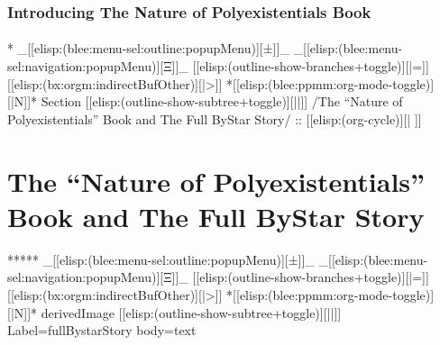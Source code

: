 \begin{whenOrg}
\begin{verblatex}
\begin{frame}[fragile,label=part_polyexistentialsBook]
    \frametitle{Introducing The Nature of Polyexistentials Book}
    \framesubtitle{}

    \tableofcontents

\end{frame}
\end{verblatex}



\begin{whenOrg}
*  _[[elisp:(blee:menu-sel:outline:popupMenu)][±]]_ _[[elisp:(blee:menu-sel:navigation:popupMenu)][Ξ]]_ [[elisp:(outline-show-branches+toggle)][|=]] [[elisp:(bx:orgm:indirectBufOther)][|>]] *[[elisp:(blee:ppmm:org-mode-toggle)][|N]]*  Section    [[elisp:(outline-show-subtree+toggle)][||]]   /The ``Nature of Polyexistentials'' Book and The Full ByStar Story/ ::  [[elisp:(org-cycle)][| ]]
\end{whenOrg}

\section{The ``Nature of Polyexistentials'' Book and The Full ByStar Story}



\begin{whenOrg}
*****  _[[elisp:(blee:menu-sel:outline:popupMenu)][±]]_ _[[elisp:(blee:menu-sel:navigation:popupMenu)][Ξ]]_ [[elisp:(outline-show-branches+toggle)][|=]] [[elisp:(bx:orgm:indirectBufOther)][|>]] *[[elisp:(blee:ppmm:org-mode-toggle)][|N]]*  derivedImage [[elisp:(outline-show-subtree+toggle)][||]] Label=fullBystarStory  body=text
\end{whenOrg}


\end{whenOrg}
